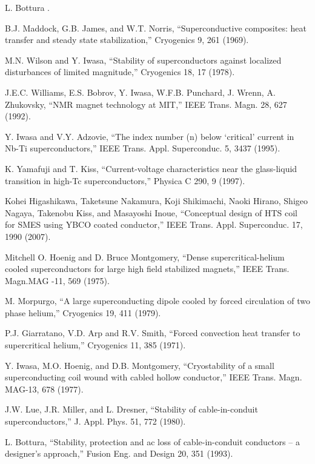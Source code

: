 \noindent [6.14] L. Bottura .

\noindent [6.15] B.J. Maddock, G.B. James, and W.T. Norris, ``Superconductive composites: heat
transfer and steady state stabilization,” Cryogenics 9, 261 (1969).

\noindent [6.16] M.N. Wilson and Y. Iwasa, ``Stability of superconductors against localized disturbances of limited magnitude,” Cryogenics 18, 17 (1978).

\noindent [6.17] J.E.C. Williams, E.S. Bobrov, Y. Iwasa, W.F.B. Punchard, J. Wrenn, A. Zhukovsky, ``NMR magnet technology at MIT,” IEEE Trans. Magn. 28, 627 (1992).

\noindent [6.18] Y. Iwasa and V.Y. Adzovie, ``The index number (n) below ‘critical’ current in
Nb-Ti superconductors,” IEEE Trans. Appl. Superconduc. 5, 3437 (1995).

\noindent [6.19] K. Yamafuji and T. Kiss, ``Current-voltage characteristics near the glass-liquid
transition in high-Tc superconductors,” Physica C 290, 9 (1997).

\noindent [6.20] Kohei Higashikawa, Taketsune Nakamura, Koji Shikimachi, Naoki Hirano, Shigeo Nagaya, Takenobu Kiss, and Masayoshi Inoue, ``Conceptual design of HTS coil for SMES using YBCO coated conductor,” IEEE Trans. Appl. Superconduc. 17, 1990
(2007).

\noindent [6.21] Mitchell O. Hoenig and D. Bruce Montgomery, ``Dense supercritical-helium cooled superconductors for large high field stabilized magnets,” IEEE Trans. Magn.MAG -11, 569 (1975).

\noindent [6.22] M. Morpurgo, ``A large superconducting dipole cooled by forced circulation of two phase helium,” Cryogenics 19, 411 (1979).

\noindent [6.23] P.J. Giarratano, V.D. Arp and R.V. Smith, ``Forced convection heat transfer to
supercritical helium,” Cryogenics 11, 385 (1971).

\noindent [6.24] Y. Iwasa, M.O. Hoenig, and D.B. Montgomery, ``Cryostability of a small superconducting coil wound with cabled hollow conductor,” IEEE Trans. Magn. MAG-13, 678 (1977).

\noindent [6.25] J.W. Lue, J.R. Miller, and L. Dresner, ``Stability of cable-in-conduit superconductors,” J. Appl. Phys. 51, 772 (1980).

\noindent [6.26] L. Bottura, ``Stability, protection and ac loss of cable-in-conduit conductors – a
designer’s approach,” Fusion Eng. and Design 20, 351 (1993).

